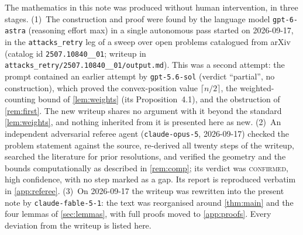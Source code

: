 \documentclass[11pt,a4paper]{article}
\theoremstyle{plain}
\theoremstyle{definition}
\theoremstyle{remark}
\begin{document}
The mathematics in this note was produced without human intervention, in three stages.
(1)~The construction and proof were found by the language model \texttt{gpt-6-astra} (reasoning effort max) in a single autonomous pass started on 2026-09-17, in the \texttt{attacks\_retry} leg of a sweep over open problems catalogued from arXiv (catalog id \texttt{2507.10840\_\_01}; writeup in \texttt{attacks\_retry/2507.10840\_\_01/output.md}). This was a second attempt: the prompt contained an earlier attempt by \texttt{gpt-5.6-sol} (verdict ``partial'', no construction), which proved the convex-position value $\lceil n/2\rceil$, the weighted-counting bound of \cref{lem:weights} (its Proposition~4.1), and the obstruction of \cref{rem:first}. The new writeup shares no argument with it beyond the standard \cref{lem:weights}, and nothing inherited from it is presented here as new.
(2)~An independent adversarial referee agent (\texttt{claude-opus-5}, 2026-09-17) checked the problem statement against the source, re-derived all twenty steps of the writeup, searched the literature for prior resolutions, and verified the geometry and the bounds computationally as described in \cref{rem:comp}; its verdict was \textsc{confirmed}, high confidence, with no step marked as a gap. Its report is reproduced verbatim in \cref{app:referee}.
(3)~On 2026-09-17 the writeup was rewritten into the present note by \texttt{claude-fable-5-1}: the text was reorganised around \cref{thm:main} and the four lemmas of \cref{sec:lemmas}, with full proofs moved to \cref{app:proofs}. Every deviation from the writeup is listed here.
\end{document}
